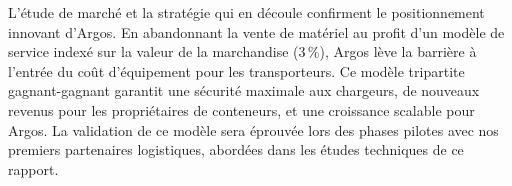 \indent L’étude de marché et la stratégie qui en découle confirment le positionnement innovant d'Argos. En abandonnant la vente de matériel au profit d'un modèle de service indexé sur la valeur de la marchandise (3\,\%), Argos lève la barrière à l'entrée du coût d'équipement pour les transporteurs. Ce modèle tripartite gagnant-gagnant garantit une sécurité maximale aux chargeurs, de nouveaux revenus pour les propriétaires de conteneurs, et une croissance scalable pour Argos. La validation de ce modèle sera éprouvée lors des phases pilotes avec nos premiers partenaires logistiques, abordées dans les études techniques de ce rapport.
